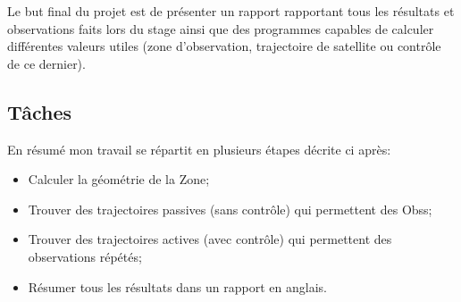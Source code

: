 \documentclass[11pt]{article} %
\begin{document}
		
		Le but final du projet est de présenter un rapport rapportant tous les résultats et observations faits lors du stage ainsi que des programmes capables de calculer différentes valeurs utiles (zone d'observation, trajectoire de satellite ou contrôle de ce dernier).
		\newpage
		\subsection{Tâches}
		En résumé mon travail se répartit en plusieurs étapes décrite ci après:
		\begin{itemize}
			\item Calculer la géométrie de la \gls{Zone};
			\item Trouver des trajectoires passives (sans contrôle) qui permettent des \glspl{Obs};
			\item Trouver des trajectoires actives (avec contrôle) qui permettent des observations répétés;
			\item Résumer tous les résultats dans un rapport en anglais.
		\end{itemize}
		
\end{document}
